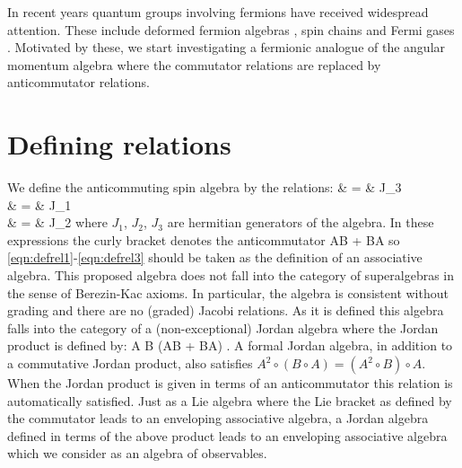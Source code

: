 \begin{comment}
The algebra of observables in quantum theory plays a fundamental
role. When classical systems are quantized, their classical
symmetry algebra acting on a set of physical observables, in
simplest examples, remains the same. For some completely
integrable non-linear models, consistent quantization requires
that the classical symmetry group be replaced by a quantum group
\cite{frt,drinfeld,woronowicz,manin} via a deformation parameter
$q = 1 + O(\hbar)$.  At the same
time, some quantum systems, most notably fermionic quantum systems
do not have any classical analogues. Nevertheless, fermions are
perhaps the most important sector of quantum phenomena. Motivated
by these considerations, we define a fermionic version of the
angular momentum algebra by the relations
\end{comment}

In recent years quantum groups involving
fermions have received widespread attention. These include
deformed fermion algebras \cite{jx,xh,sm,chung}, spin chains
\cite{nt,gppr,bnnpsw} and Fermi gases \cite{ubriaco}. Motivated by
these, we start investigating a fermionic analogue of the
angular momentum algebra where the commutator relations are replaced
by anticommutator relations.

\section{Defining relations}

We define the anticommuting spin algebra by the relations:
\bea
{} & = & J_3 \label{eqn:defrel1} \\
 & = & J_1 \label{eqn:defrel2} \\
 & = & J_2 \label{eqn:defrel3}
\eea
where $J_1$, $J_2$, $J_3$ are hermitian generators of the algebra.
In these expressions the curly bracket denotes the anticommutator
\beq
{} \equiv AB + BA
\eeq
so \eqref{eqn:defrel1}-\eqref{eqn:defrel3} should be taken as the
definition of an associative algebra. This proposed algebra does
not fall into the category of superalgebras in the sense of
Berezin-Kac axioms. In particular, the algebra is consistent
without grading and there are no (graded) Jacobi relations. As it
is defined this algebra falls into the category of a
(non-exceptional) Jordan algebra where the Jordan product is
defined by: \beq A \circ B \equiv {} (AB + BA) \quad . \eeq A
formal Jordan algebra, in addition to a commutative Jordan
product, also satisfies $A^2\circ(B\circ A) = (A^2\circ B)\circ
A$. When the Jordan product is given in terms of an anticommutator
this relation is automatically satisfied. Just as a Lie algebra
where the Lie bracket as defined by the commutator leads to an
enveloping associative algebra, a Jordan algebra defined in terms
of the above product leads to an enveloping associative algebra
which we consider as an algebra of observables.

